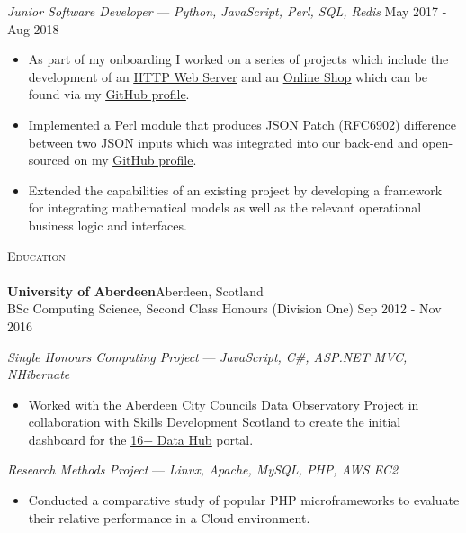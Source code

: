 \documentclass[a4paper]{article}
\newcommand{\lineunder} {
    \vspace*{-8pt} \\
    \hspace*{-18pt} \hrulefill \\
}
\newcommand{\header} [1] {
    {\hspace*{-18pt}\vspace*{6pt} \textsc{#1}}
    \vspace*{-6pt} \lineunder
}
\begin{document}
\textit{Junior Software Developer} — {\sl Python, JavaScript, Perl, SQL, Redis} \hfill May 2017 - Aug 2018\\
\vspace{-1mm}
\begin{itemize} \itemsep 1pt
	\item As part of my onboarding I worked on a series of projects which include the development of an \href{https://github.com/velislavgerov/exercise02}{\underline{HTTP Web Server}} and an \href{https://github.com/velislavgerov/exercise03}{\underline{Online Shop}} which can be found via my \href{https://github.com/velislavgerov}{\underline{GitHub profile}}.
	\item Implemented a \href{https://github.com/velislavgerov/telebid-hackschool/tree/master/perl-json-diff}{\underline{Perl module}} that produces JSON Patch (RFC6902) difference between two JSON inputs which was integrated into our back-end and open-sourced on my \href{https://github.com/velislavgerov}{\underline{GitHub profile}}.
	\item Extended the capabilities of an existing project by developing a framework for integrating mathematical models as well as the relevant operational business logic and interfaces.
\end{itemize}

\header{Education}
\textbf{University of Aberdeen}\hfill Aberdeen, Scotland\\
BSc Computing Science, Second Class Honours (Division One) \hfill Sep 2012 - Nov 2016\\
\vspace*{2mm}

{\textit{Single Honours Computing Project}} — {\sl JavaScript, C\#, ASP.NET MVC, NHibernate}\
\vspace{-1mm}
\begin{itemize} \itemsep 1pt
	\item Worked with the Aberdeen City Council\textquotesingle{}s Data Observatory Project in collaboration with Skills Development Scotland to create the initial dashboard for the \href{https://www.skillsdevelopmentscotland.co.uk/what-we-do/scotlands-careers-services/16plus-data-hub/}{\underline{16+ Data Hub}} portal.\\
\end{itemize}

{\textit{Research Methods Project}} — {\sl Linux, Apache, MySQL, PHP, AWS EC2 }\
\vspace{-1mm}
\begin{itemize} \itemsep 1pt
	\item Conducted a comparative study of popular PHP microframeworks to evaluate their relative performance in a Cloud environment.
\end{itemize}
\end{document}
